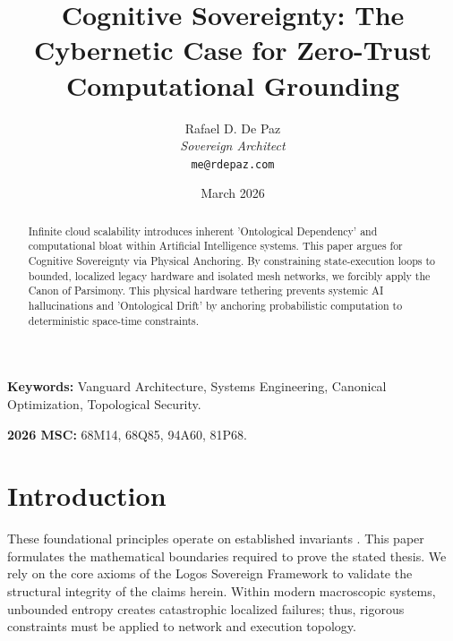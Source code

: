 \documentclass[12pt, a4paper]{article}
\theoremstyle{plain}
\theoremstyle{definition}
\theoremstyle{remark}
\begin{document}
\title{
  \textbf{Cognitive Sovereignty: The Cybernetic Case for Zero-Trust Computational Grounding}
}
\author{
  Rafael D. De Paz \\
  \textit{Sovereign Architect} \\
  \texttt{me@rdepaz.com}
}
\date{March 2026}
\maketitle

\begin{abstract}
Infinite cloud scalability introduces inherent 'Ontological Dependency' and computational bloat within Artificial Intelligence systems. This paper argues for Cognitive Sovereignty via Physical Anchoring. By constraining state-execution loops to bounded, localized legacy hardware and isolated mesh networks, we forcibly apply the Canon of Parsimony. This physical hardware tethering prevents systemic AI hallucinations and 'Ontological Drift' by anchoring probabilistic computation to deterministic space-time constraints.
\end{abstract}

\vspace{1em}
\noindent\textbf{Keywords:} Vanguard Architecture, Systems Engineering, Canonical Optimization, Topological Security.

\vspace{0.5em}
\noindent\textbf{2026 MSC:} 68M14, 68Q85, 94A60, 81P68.

\section{Introduction}
These foundational principles operate on established invariants \cite{rose2020zero,satyanarayanan2017emergence}.\label{sec:intro}
This paper formulates the mathematical boundaries required to prove the stated thesis. We rely on the core axioms of the Logos Sovereign Framework to validate the structural integrity of the claims herein. Within modern macroscopic systems, unbounded entropy creates catastrophic localized failures; thus, rigorous constraints must be applied to network and execution topology.
\end{document}
